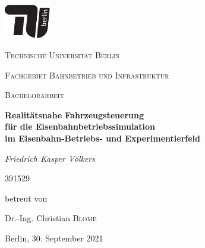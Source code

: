 \newpage
\centering
\includegraphics[width=0.15\textwidth]{../images/tu_Logo/TU_Logo_kurz_1c_schwarz.pdf}\par\vspace{1cm}
{\scshape\LARGE Technische Universität Berlin\par}
\vspace{0cm}
{\scshape\normalsize Fachgebiet Bahnbetrieb und Infrastruktur\par}
\vspace{1cm}
{\scshape\LARGE Bachelorarbeit\par}
\vspace{1.5cm}
{\LARGE\bfseries Realitätsnahe Fahrzeugsteuerung\\für die Eisenbahnbetriebssimulation\\im Eisenbahn-Betriebs- und Experimentierfeld\par}
\vspace{2cm}
{\Large\itshape Friedrich Kasper Völkers\par}
\vspace{0cm}
{\normalsize 391529\par}
\vfill
betreut von\par
Dr.-Ing. Christian \textsc{Blome}
\vfill
{\large Berlin, 30. September 2021\par}
\justifying
\newpage